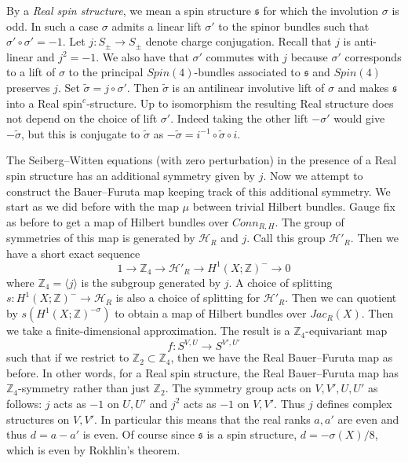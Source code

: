 \documentclass{amsart}
\theoremstyle{definition}
\theoremstyle{remark}
\numberwithin{equation}{section}
\begin{document}
By a {\em Real spin structure}, we mean a spin structure $\mathfrak{s}$ for which the involution $\sigma$ is odd. In such a case $\sigma$ admits a linear lift $\sigma'$ to the spinor bundles such that $\sigma' \circ \sigma' = -1$. Let $j : S_{\pm} \to S_{\pm}$ denote charge conjugation. Recall that $j$ is anti-linear and $j^2 = - 1$. We also have that $\sigma'$ commutes with $j$ because $\sigma'$ corresponds to a lift of $\sigma$ to the principal $Spin(4)$-bundles associated to $\mathfrak{s}$ and $Spin(4)$ preserves $j$. Set $\widetilde{\sigma} = j \circ \sigma'$. Then $\widetilde{\sigma}$ is an antilinear involutive lift of $\sigma$ and makes $\mathfrak{s}$ into a Real spin$^c$-structure. Up to isomorphism the resulting Real structure does not depend on the choice of lift $\sigma'$. Indeed taking the other lift $-\sigma'$ would give $-\widetilde{\sigma}$, but this is conjugate to $\widetilde{\sigma}$ as $-\widetilde{\sigma} = i^{-1} \circ \widetilde{\sigma} \circ i$.

The Seiberg--Witten equations (with zero perturbation) in the presence of a Real spin structure has an additional symmetry given by $j$. Now we attempt to construct the Bauer--Furuta map keeping track of this additional symmetry. We start as we did before with the map $\mu$ between trivial Hilbert bundles. Gauge fix as before to get a map of Hilbert bundles over $Conn_{R,H}$. The group of symmetries of this map is generated by $\mathcal{H}_R$ and $j$. Call this group $\mathcal{H}'_R$. Then we have a short exact sequence
\[
1 \to \mathbb{Z}_4 \to \mathcal{H}'_R \to H^1(X ; \mathbb{Z})^{-} \to 0
\]
where $\mathbb{Z}_4 = \langle j \rangle$ is the subgroup generated by $j$. A choice of splitting $s : H^1(X ; \mathbb{Z})^{-} \to \mathcal{H}_R$ is also a choice of splitting for $\mathcal{H}'_R$. Then we can quotient by $s(H^1(X ; \mathbb{Z})^{-\sigma})$ to obtain a map of Hilbert bundles over $Jac_R(X)$. Then we take a finite-dimensional approximation. The result is a $\mathbb{Z}_4$-equivariant map
\[
f : S^{V,U} \to S^{V',U'}
\]
such that if we restrict to $\mathbb{Z}_2 \subset \mathbb{Z}_4$, then we have the Real Bauer--Furuta map as before. In other words, for a Real spin structure, the Real Bauer--Furuta map has $\mathbb{Z}_4$-symmetry rather than just $\mathbb{Z}_2$. The symmetry group acts on $V,V',U,U'$ as follows: $j$ acts as $-1$ on $U,U'$ and $j^2$ acts as $-1$ on $V,V'$. Thus $j$ defines complex structures on $V,V'$. In particular this means that the real ranks $a,a'$ are even and thus $d = a-a'$ is even. Of course since $\mathfrak{s}$ is a spin structure, $d = -\sigma(X)/8$, which is even by Rokhlin's theorem.
\end{document}
